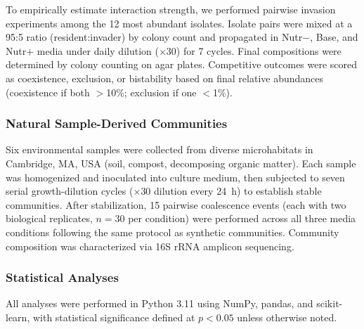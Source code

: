 To empirically estimate interaction strength, we performed pairwise invasion experiments among the 12 most abundant isolates. Isolate pairs were mixed at a 95:5 ratio (resident:invader) by colony count and propagated in Nutr$-$, Base, and Nutr$+$ media under daily dilution ($\times$30) for 7 cycles. Final compositions were determined by colony counting on agar plates. Competitive outcomes were scored as coexistence, exclusion, or bistability based on final relative abundances (coexistence if both $>$10\%; exclusion if one $<$1\%). 


\subsubsection*{Natural Sample-Derived Communities}
\label{sec:suppl:natural}

Six environmental samples were collected from diverse microhabitats in Cambridge, MA, USA (soil, compost, decomposing organic matter). Each sample was homogenized and inoculated into culture medium, then subjected to seven serial growth-dilution cycles ($\times$30 dilution every 24~h) to establish stable communities. After stabilization, 15 pairwise coalescence events (each with two biological replicates, $n = 30$ per condition) were performed across all three media conditions following the same protocol as synthetic communities. Community composition was characterized via 16S rRNA amplicon sequencing.


\subsubsection*{Statistical Analyses}
\label{sec:suppl:statistics}

All analyses were performed in Python 3.11 using NumPy, pandas, and scikit-learn, with statistical significance defined at $p < 0.05$ unless otherwise noted.

